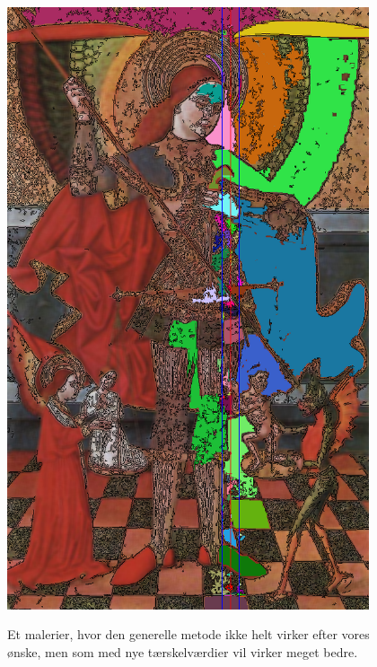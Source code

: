 \begin{figure}[!h]
{        \includegraphics[angle=270,width=0.95\textwidth]{afsnit/afprovning/billeder/thressholds/krafitige_farver/krafite_detalier/s7_e200_f5.png}
        \label{GRD_virker_nesten1_super}}\\
     \caption[]{Et malerier, hvor den generelle metode ikke helt virker
	 efter vores ønske, men som med nye tærskelværdier vil virker meget bedre.}
     \label{generelde_region_detektor_virker_nesten1}
\end{figure}

